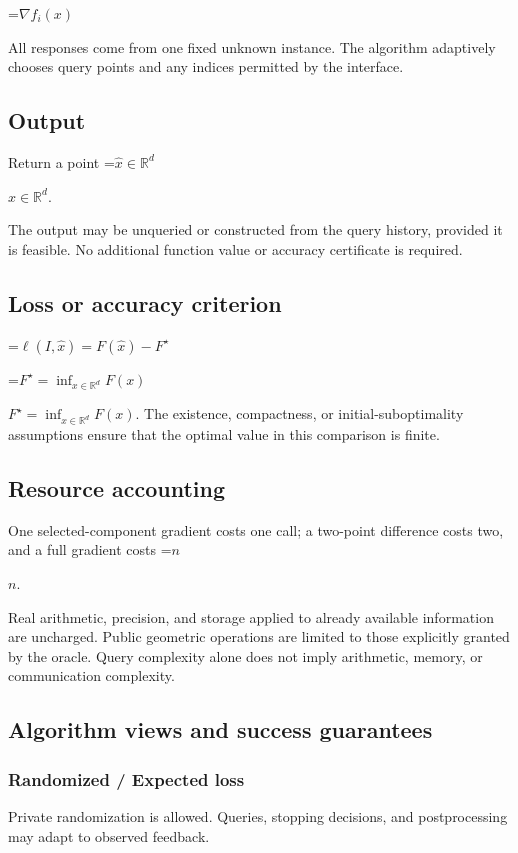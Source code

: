 \documentclass[10pt,a4paper]{article}
\newcommand{\AtlasMath}[1]{\par\begingroup\centering\setbox0=\hbox{$\displaystyle #1$}\ifdim\wd0>1.4\linewidth\typeout{ATLAS WIDE FORMULA: \the\wd0}\fi\ifdim\wd0>\linewidth\resizebox{\linewidth}{!}{\box0}\else\box0\fi\par\endgroup}
\newcommand{\AtlasInlineMath}[1]{\begingroup\setbox0=\hbox{$#1$}\ifdim\wd0>.4\linewidth\endgroup\AtlasMath{#1}\else\endgroup$#1$\fi}
\begin{document}
\AtlasMath{\nabla f_i(x)}


All responses come from one fixed unknown instance. The algorithm adaptively chooses query points and any indices permitted by the interface.

\subsection{Output}
Return a point \AtlasInlineMath{\widehat x\in\mathbb R^d}.

The output may be unqueried or constructed from the query history, provided it is feasible. No additional function value or accuracy certificate is required.

\subsection{Loss or accuracy criterion}

\AtlasMath{\ell(I,\widehat{x})=F(\widehat{x})-F^\star}


\AtlasInlineMath{F^\star=\inf_{x\in \mathbb{R}^d}F(x)}. The existence, compactness, or initial-suboptimality assumptions ensure that the optimal value in this comparison is finite.

\subsection{Resource accounting}
One selected-component gradient costs one call; a two-point difference costs two, and a full gradient costs \AtlasInlineMath{n}.

Real arithmetic, precision, and storage applied to already available information are uncharged. Public geometric operations are limited to those explicitly granted by the oracle. Query complexity alone does not imply arithmetic, memory, or communication complexity.

\subsection{Algorithm views and success guarantees}
\subsubsection{Randomized / Expected loss}
Private randomization is allowed. Queries, stopping decisions, and postprocessing may adapt to observed feedback.
\end{document}
